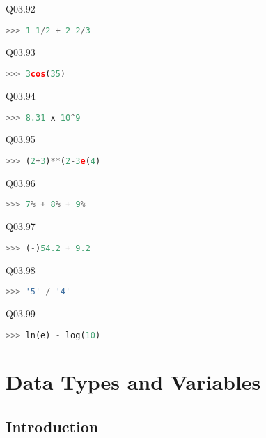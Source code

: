 \documentclass{book}
\begin{document}
Q03.92

\begin{lstlisting}[language=Python]
>>> 1 1/2 + 2 2/3
\end{lstlisting}

Q03.93

\begin{lstlisting}[language=Python]
>>> 3cos(35)
\end{lstlisting}

Q03.94

\begin{lstlisting}[language=Python]
>>> 8.31 x 10^9
\end{lstlisting}

Q03.95

\begin{lstlisting}[language=Python]
>>> (2+3)**(2-3e(4)
\end{lstlisting}

Q03.96

\begin{lstlisting}[language=Python]
>>> 7% + 8% + 9%
\end{lstlisting}

Q03.97

\begin{lstlisting}[language=Python]
>>> (-)54.2 + 9.2
\end{lstlisting}

Q03.98

\begin{lstlisting}[language=Python]
>>> '5' / '4'
\end{lstlisting}

Q03.99

\begin{lstlisting}[language=Python]
>>> ln(e) - log(10)
\end{lstlisting}
    




    
        \hypertarget{data-types-and-variables}{%
\chapter{Data Types and Variables}\label{data-types-and-variables}}
    




    
        \hypertarget{introduction}{%
\section{Introduction}\label{introduction}}
    
\end{document}
